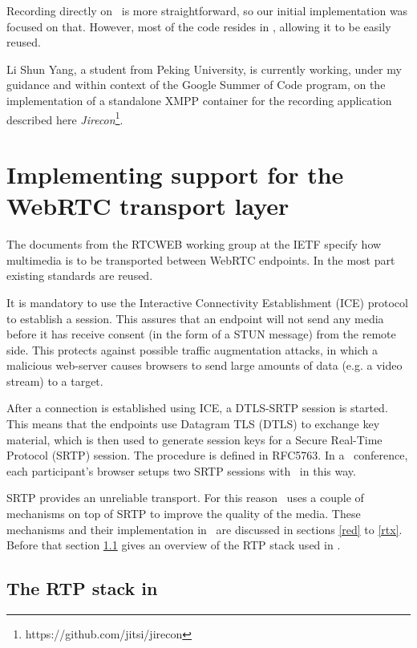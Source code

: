 \documentclass[twoside,openright,a4paper,12pt,english]{article}
\begin{document}
Recording directly on \jvb\ is more straightforward, so our initial
implementation was focused on that. However, most of the code resides in \lj, allowing
it to be easily reused.

Li Shun Yang, a student from Peking University, is currently working, under my guidance and within context of the
Google Summer of Code program, on the implementation of a standalone XMPP
container for the recording application described here
\emph{Jirecon}\footnote{https://github.com/jitsi/jirecon}.



\section{Implementing support for the WebRTC transport layer}
The documents from the RTCWEB working group at the IETF specify how multimedia
is to be transported between WebRTC endpoints. In the most part existing
standards are reused.

It is mandatory to use the Interactive Connectivity Establishment (ICE\cite{ice}) protocol to
establish a session. This assures that an endpoint will not send any media
before it has receive consent (in the form of a STUN message) from the remote
side. This protects against possible traffic augmentation attacks, in which a malicious
web-server causes browsers to send large amounts of data (e.g. a video stream) to a
target.

After a connection is established using ICE, a DTLS-SRTP session is started.
This means that the endpoints use Datagram TLS (DTLS\cite{dtls})
to exchange key material, which is then used to generate session keys for a
Secure Real-Time Protocol (SRTP\cite{srtp})
session. The procedure is defined in RFC5763\cite{rfc5763}.
In a \jm\ conference, each participant's browser setups two SRTP sessions with
\jvb\ in this way.

\medskip
SRTP provides an unreliable transport. For this reason \wrtc\ uses a couple of
mechanisms on top of SRTP to improve the quality of the media. These mechanisms
and their implementation in \lj\ are discussed in sections \ref{red} to
\ref{rtx}. Before that section \ref{lj} gives an overview of the RTP stack used
in \lj.


\subsection{The RTP stack in \lj}
\label{lj}
\end{document}
